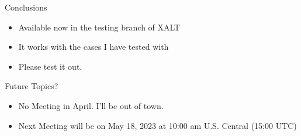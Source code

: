 \documentclass{beamer}
\begin{document}
\begin{frame}{Conclusions}
  \begin{itemize}
    \item Available now in the testing branch of XALT
    \item It works with the cases I have tested with
    \item Please test it out.
  \end{itemize}
\end{frame}

\begin{frame}{Future Topics?}
  \begin{itemize}
    \item No Meeting in April.  I'll be out of town.
    \item Next Meeting will be on May 18, 2023 at 10:00 am
      U.S. Central (15:00 UTC)
  \end{itemize}
\end{frame}

%
\end{document}
